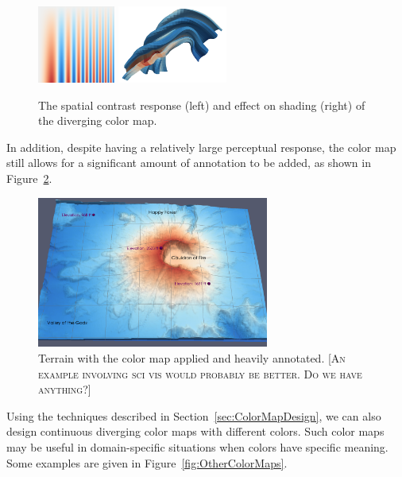 \documentclass{vgtc}                          %
\newcommand{\sticky}[1]{\textsc{[#1]}}
\begin{document}
\begin{figure}
  \centering
  \includegraphics[height=1in]{images/Cool2WarmSpatialContrast}
  \quad
  \includegraphics[height=1in]{images/Cool2WarmShading}
  \caption{The spatial contrast response (left) and effect on shading
    (right) of the diverging color map.}
  \label{fig:Cool2WarmResponse}
\end{figure}

In addition, despite having a relatively large perceptual response, the
color map still allows for a significant amount of annotation to be added, as
shown in Figure~\ref{fig:ColorMapWithAnnotation}.

\begin{figure}
  \centering
  \includegraphics[width=3in]{images/AnnotationExample}
  \caption{Terrain with the color map applied and heavily annotated. \sticky{An example involving sci vis would probably be better.  Do we have anything?}}
  \label{fig:ColorMapWithAnnotation}
\end{figure}

Using the techniques described in Section~\ref{sec:ColorMapDesign}, we can
also design continuous diverging color maps with different colors.  Such
color maps may be useful in domain-specific situations when colors have
specific meaning.  Some examples are given in
Figure~\ref{fig:OtherColorMaps}.
\end{document}
